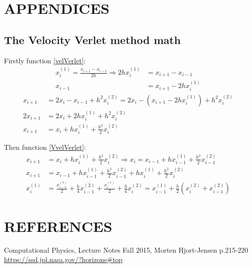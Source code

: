 \documentclass[a4paper]{article}
\begin{document}
	\section{APPENDICES}
	
	\subsection{The Velocity Verlet method math}\label{vVerlet_math}
	
	Firstly function \ref{velVerlet}:
	\begin{align}
	x_i^{(1)} = \frac{x_{i+1} - x_{i-1}}{2h} \Rightarrow 2hx_i^{(1)} &= x_{i+1} - x_{i-1} \\
	x_{i-1} &= x_{i+1} - 2hx_i^{(1)}
	\end{align}
	\begin{align}
	x_{i+1} &= 2x_i - x_{i-1} + h^2 x_i^{(2)} = 2x_i - \left( x_{i+1} - 2hx_i^{(1)} \right)  + h^2 x_i^{(2)} \\
	2 x_{i+1} &= 2x_i + 2hx_i^{(1)} + h^2 x_i^{(2)} \\
	x_{i+1} &= x_i + hx_i^{(1)} + \frac{h^2}{2} x_i^{(2)} 
	\end{align}
	
	Then function \ref{VvelVerlet}:
	\begin{align}
	x_{i+1} &= x_i + hx_i^{(1)} + \frac{h^2}{2} x_i^{(2)} \Rightarrow x_{i} = x_{i-1} + hx_{i-1}^{(1)} + \frac{h^2}{2} x_{i-1}^{(2)} \\
	x_{i+1} &= x_{i-1} + hx_{i-1}^{(1)} + \frac{h^2}{2} x_{i-1}^{(2)} + hx_i^{(1)} + \frac{h^2}{2} x_i^{(2)} \\
	x_i^{(1)} &= \frac{x_{i-1}^{(1)}}{2} + \frac{h}{4} x_{i-1}^{(2)} + \frac{x_i^{(1)}}{2} + \frac{h}{4} x_i^{(2)}
	= x_{i-1}^{(1)} + \frac{h}{2} \left( x_i^{(2)} + x_{i-1}^{(2)} \right) 
	\end{align}
	
	
	\section{REFERENCES}
	\begin{thebibliography}{9}
		Computational Physics, Lecture Notes Fall 2015, Morten Hjort-Jensen p.215-220
		\url{https://ssd.jpl.nasa.gov/?horizons#top}
	\end{thebibliography}
	
	
	
	
	
	
	
	
	
	
	
	
	
	
	
	
	
	
	
	
	
	
	
	
	
	
\end{document}
